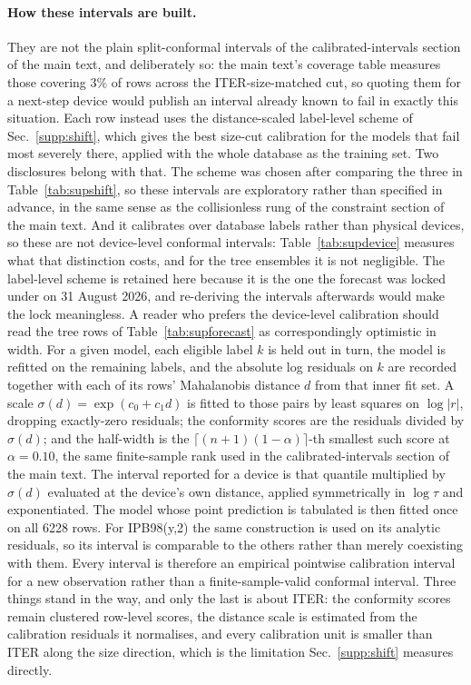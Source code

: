 \documentclass[12pt,letterpaper]{article}
\begin{document}
\paragraph{How these intervals are built.} They are not the plain
split-conformal intervals of the calibrated-intervals section of the main text, and deliberately so:
the main text's coverage table measures those covering 3\% of rows across the
ITER-size-matched cut, so quoting them for a next-step device would publish an
interval already known to fail in exactly this situation. Each row instead uses
the distance-scaled label-level scheme of Sec.~\ref{supp:shift}, which gives the
best size-cut calibration for the models that fail most severely there, applied
with the whole
database as the training set. Two disclosures belong with that. The scheme was
chosen after comparing the three in Table~\ref{tab:supshift}, so these intervals
are exploratory rather than specified in advance, in the same sense as the
collisionless rung of the constraint section of the main text. And it calibrates over database
labels rather than physical devices, so these are not device-level conformal
intervals: Table~\ref{tab:supdevice} measures what that distinction costs, and for
the tree ensembles it is not negligible. The label-level scheme is retained here
because it is the one the forecast was locked under on 31 August 2026, and
re-deriving the intervals afterwards would make the lock meaningless. A reader
who prefers the device-level calibration should read the tree rows of
Table~\ref{tab:supforecast} as correspondingly optimistic in width. For a given model, each eligible label $k$ is
held out in turn, the model is refitted on the remaining labels, and the
absolute log residuals on $k$ are recorded together with each of its rows'
Mahalanobis distance $d$ from that inner fit set. A scale
$\sigma(d)=\exp(c_0+c_1 d)$ is fitted to those pairs by least squares on
$\log\lvert r\rvert$, dropping exactly-zero residuals; the conformity scores are
the residuals divided by $\sigma(d)$; and the half-width is the
$\lceil (n+1)(1-\alpha)\rceil$-th smallest such score at $\alpha=0.10$, the same
finite-sample rank used in the calibrated-intervals section of the main text. The interval reported for a
device is that quantile multiplied by $\sigma(d)$ evaluated at the device's own
distance, applied symmetrically in $\log\tau$ and exponentiated. The model whose
point prediction is tabulated is then fitted once on all 6228 rows. For
IPB98(y,2) the same construction is used on its analytic residuals, so its
interval is comparable to the others rather than merely coexisting with them.
Every interval is therefore an empirical pointwise calibration interval for a
new observation rather than a finite-sample-valid conformal interval. Three
things stand in the way, and only the last is about ITER: the conformity scores
remain clustered row-level scores, the distance scale is estimated from the
calibration residuals it normalises, and every calibration unit is smaller than
ITER along the size direction, which is the limitation
Sec.~\ref{supp:shift} measures directly.
\end{document}
